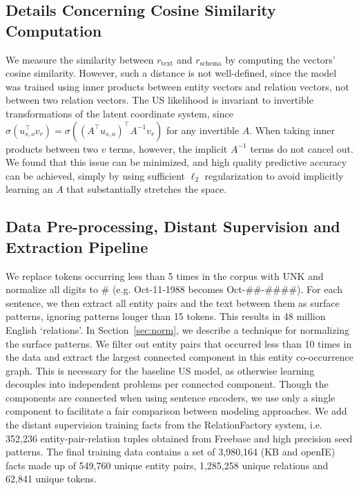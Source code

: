 \subsection{Details Concerning Cosine Similarity Computation \label{app:cosine}}
We measure the similarity between $r_{\text{text}}$ and $r_{\text{schema}}$ by computing the vectors' cosine similarity. However, such a distance is not well-defined, since the model was trained using inner products between entity vectors and relation vectors, not between two relation vectors. The US likelihood is invariant to invertible transformations of the latent coordinate system, since $\sigma\left( u_{s,o}^\top v_r \right) = \sigma\left( (A^\top u_{s,o})^\top A^{-1} v_r \right)$ for any invertible $A$. When taking inner products between two $v$ terms, however, the implicit $A^{-1}$ terms do not cancel out. We found that this issue can be minimized, and high quality predictive accuracy can be achieved, simply by using sufficient $\ell_2$ regularization to avoid implicitly learning an $A$ that substantially stretches the space.

\subsection{Data Pre-processing, Distant Supervision and Extraction Pipeline \label{sec:ds-el}}

We replace tokens occurring less than 5 times in the corpus with UNK and normalize all digits to \# (e.g. Oct-11-1988 becomes Oct-\#\#-\#\#\#\#).
For each sentence, we then extract all entity pairs and the text between them as surface patterns, ignoring patterns longer than 15 tokens.
This results in 48 million English `relations'. In Section~\ref{sec:norm}, we describe a technique for normalizing the surface patterns.
We filter out entity pairs that occurred less than 10 times in the data and extract the largest connected component in this entity co-occurrence graph.
This is necessary for the baseline US model, as otherwise learning decouples into independent problems per connected component.
Though the components are connected when using sentence encoders, we use only a single component to facilitate a fair comparison between modeling approaches.
We add the distant supervision training facts from the RelationFactory system, i.e. 352,236 entity-pair-relation tuples obtained from Freebase and high precision seed patterns.
The final training data contains a set of 3,980,164 (KB and openIE) facts made up of 549,760 unique entity pairs, 1,285,258 unique relations and 62,841 unique tokens.

